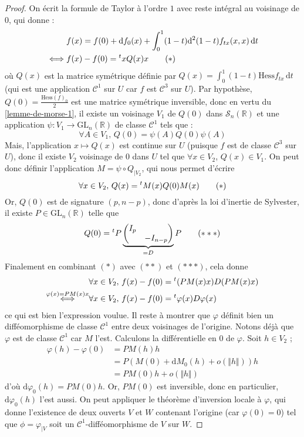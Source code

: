 	\begin{proof}
		On écrit la formule de Taylor à l'ordre $1$ avec reste intégral au voisinage de $0$, qui donne :
		\begin{align*}
			&f(x) = f(0) + \mathrm{d} f_0(x) + \int_0^1 (1-t) \mathrm{d}^2 (1-t) f_{tx} (x, x) \, \mathrm{d}t \\
			\iff& f(x) - f(0) = \mathstrut ^t x Q(x) x \tag{$*$}
		\end{align*}
		où $Q(x)$ est la matrice symétrique définie par $Q(x) = \int_0^1 (1-t) \mathrm{Hess} f_{tx} \, \mathrm{d}t$ (qui est une application $\mathcal{C}^1$ sur $U$ car $f$ est $\mathcal{C}^3$ sur $U$).
		\newpar
		Par hypothèse, $Q(0) = \frac{\mathrm{Hess} (f)_0}{2}$ est une matrice symétrique inversible, donc en vertu du \cref{lemme-de-morse-1}, il existe un voisinage $V_1$ de $Q(0)$ dans $\mathcal{S}_n(\mathbb{R})$ et une application $\psi : V_1 \rightarrow \mathrm{GL}_n(\mathbb{R})$ de classe $\mathcal{C}^1$ tels que :
		\[ \forall A \in V_1, \, Q(0) = \psi(A) Q(0) \psi(A) \]
		Mais, l'application $x \mapsto Q(x)$ est continue sur $U$ (puisque $f$ est de classe $\mathcal{C}^3$ sur $U$), donc il existe $V_2$ voisinage de $0$ dans $U$ tel que $\forall x \in V_2$, $Q(x) \in V_1$. On peut donc définir l'application $M = \psi \circ Q_{|V_2}$, qui nous permet d'écrire
		\[ \forall x \in V_2, \, Q(x) = \mathstrut ^t M (x) Q(0) M (x) \tag{$*$} \]
		Or, $Q(0)$ est de signature $(p, n-p)$, donc d'après la loi d'inertie de Sylvester, il existe $P \in \mathrm{GL}_n(\mathbb{R})$ telle que
		\[ Q(0) = \mathstrut ^t P \underbrace{\begin{pmatrix} I_p & \\ & - I_{n-p} \end{pmatrix}}_{= D} P \tag{$***$} \]
		Finalement en combinant $(*)$ avec $(**)$ et $(***)$, cela donne
		\begin{align*}
			&\forall x \in V_2, \, f(x) - f(0) = \mathstrut ^t (P M(x) x) D (P M(x) x) \\
			\overset{\varphi(x) = P M(x) x}{\iff}& \forall x \in V_2, \, f(x) - f(0) = \mathstrut ^t \varphi(x) D \varphi(x)
		\end{align*}
		ce qui est bien l'expression voulue.
		\newpar
		Il reste à montrer que $\varphi$ définit bien un difféomorphisme de classe $\mathcal{C}^1$ entre deux voisinages de l'origine. Notons déjà que $\varphi$ est de classe $\mathcal{C}^1$ car $M$ l'est. Calculons la différentielle en $0$ de $\varphi$. Soit $h \in V_2$ ;
		\begin{align*}
			\varphi(h) - \varphi(0) &= P M(h) h \\
			&= P( M(0) + \mathrm{d} M_0 (h) + o(\Vert h \Vert))h \\
			&= P M(0) h + o(\Vert h \Vert)
		\end{align*}
		d'où $\mathrm{d} \varphi_0 (h) = P M(0) h$. Or, $P M(0)$ est inversible, donc en particulier, $\mathrm{d} \varphi_0 (h)$ l'est aussi. On peut appliquer le théorème d'inversion locale à $\varphi$, qui donne l'existence de deux ouverts $V$ et $W$ contenant l'origine (car $\varphi(0) = 0$) tel que $\phi = \varphi_{|V}$ soit un $\mathcal{C}^1$-difféomorphisme de $V$ sur $W$.
	\end{proof}

